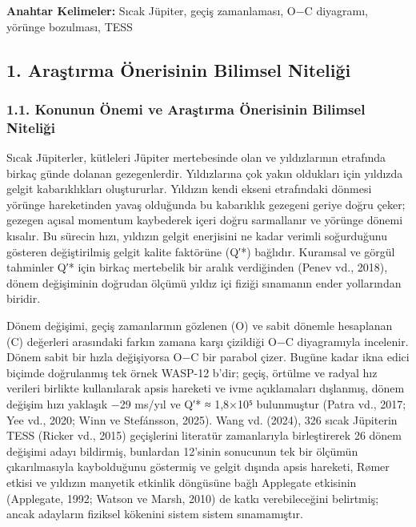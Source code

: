 \textbf{Anahtar Kelimeler:} Sıcak Jüpiter, geçiş zamanlaması, O−C diyagramı, yörünge bozulması, TESS

\subsection*{1. Araştırma Önerisinin Bilimsel Niteliği}
\subsubsection*{1.1. Konunun Önemi ve Araştırma Önerisinin Bilimsel Niteliği}
Sıcak Jüpiterler, kütleleri Jüpiter mertebesinde olan ve yıldızlarının etrafında birkaç günde dolanan gezegenlerdir. Yıldızlarına çok yakın oldukları için yıldızda gelgit kabarıklıkları oluştururlar. Yıldızın kendi ekseni etrafındaki dönmesi yörünge hareketinden yavaş olduğunda bu kabarıklık gezegeni geriye doğru çeker; gezegen açısal momentum kaybederek içeri doğru sarmallanır ve yörünge dönemi kısalır. Bu sürecin hızı, yıldızın gelgit enerjisini ne kadar verimli soğurduğunu gösteren değiştirilmiş gelgit kalite faktörüne (Q′*) bağlıdır. Kuramsal ve görgül tahminler Q′* için birkaç mertebelik bir aralık verdiğinden (Penev vd., 2018), dönem değişiminin doğrudan ölçümü yıldız içi fiziği sınamanın ender yollarından biridir.

Dönem değişimi, geçiş zamanlarının gözlenen (O) ve sabit dönemle hesaplanan (C) değerleri arasındaki farkın zamana karşı çizildiği O−C diyagramıyla incelenir. Dönem sabit bir hızla değişiyorsa O−C bir parabol çizer. Bugüne kadar ikna edici biçimde doğrulanmış tek örnek WASP-12 b'dir; geçiş, örtülme ve radyal hız verileri birlikte kullanılarak apsis hareketi ve ivme açıklamaları dışlanmış, dönem değişim hızı yaklaşık −29 ms/yıl ve Q′* ≈ 1,8×10⁵ bulunmuştur (Patra vd., 2017; Yee vd., 2020; Winn ve Stefánsson, 2025). Wang vd. (2024), 326 sıcak Jüpiterin TESS (Ricker vd., 2015) geçişlerini literatür zamanlarıyla birleştirerek 26 dönem değişimi adayı bildirmiş, bunlardan 12'sinin sonucunun tek bir ölçümün çıkarılmasıyla kaybolduğunu göstermiş ve gelgit dışında apsis hareketi, Rømer etkisi ve yıldızın manyetik etkinlik döngüsüne bağlı Applegate etkisinin (Applegate, 1992; Watson ve Marsh, 2010) de katkı verebileceğini belirtmiş; ancak adayların fiziksel kökenini sistem sistem sınamamıştır.

